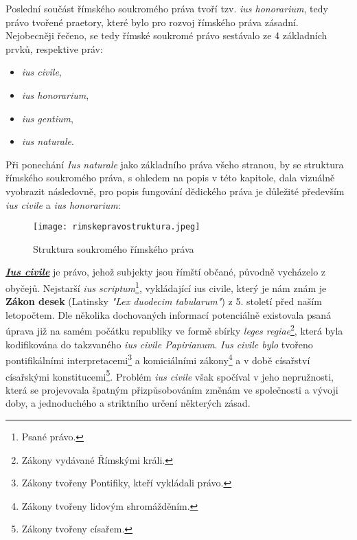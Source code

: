 \documentclass{article}
\begin{document}
Poslední součást římského soukromého práva tvoří tzv. \textit{ius honorarium}, tedy právo tvořené praetory, které bylo pro rozvoj římského práva zásadní. \\


Nejobecněji řečeno, se tedy římské soukromé právo sestávalo ze 4 základních prvků, respektive práv:
\vspace{5 mm}

\begin{itemize}
\item \textit{ius civile},
\item \textit{ius honorarium},
\item \textit{ius gentium},
\item \textit{ius naturale}.
\end{itemize}

\vspace{5 mm}


Při ponechání \textit{Ius naturale} jako základního práva všeho stranou, by se struktura římského soukromého práva, s ohledem na popis v této kapitole, dala vizuálně vyobrazit následovně, pro popis fungování dědického práva je důležité především \textit{ius civile} a \textit{ius honorarium}:

\begin{figure}[h]
\centering
\texttt{[image: rimskepravostruktura.jpeg]}
\caption{Struktura soukromého římského práva}
\label{fig:struktura}
\end{figure}

\underline{\textbf{\textit{Ius civile}}} je právo, jehož subjekty jsou římští občané, původně vycházelo z obyčejů. Nejstarší \textit{ius scriptum}\footnote{Psané právo.}, vykládající ius civile, který je nám znám je \textbf{Zákon \MakeUppercase{} desek} (Latinsky \textit{"Lex duodecim tabularum"}) z 5. století před naším letopočtem. Dle několika dochovaných informací potenciálně existovala psaná úprava již na samém počátku republiky ve formě sbírky \textit{leges regiae}\footnote{Zákony vydávané Římskými králi.}, která byla kodifikována do takzvaného \textit{ius civile Papirianum}. \textit{Ius civile bylo} tvořeno pontifikálními interpretacemi\footnote{Zákony tvořeny Pontifiky, kteří vykládali právo.} a komiciálními zákony\footnote{Zákony tvořeny lidovým shromážděním.} a v době císařství císařskými konstitucemi\footnote{Zákony tvořeny císařem.}. Problém \textit{ius civile} však spočíval v jeho nepružnosti, která se projevovala špatným přizpůsobováním změnám ve společnosti a vývoji doby, a jednoduchého a striktního určení některých zásad. \\
\end{document}
